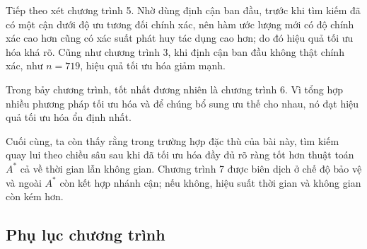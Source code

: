 \documentclass[11pt]{article}
\begin{document}
Tiếp theo xét chương trình 5. Nhờ dùng định cận ban đầu, trước khi tìm kiếm
đã có một cận dưới độ ưu tương đối chính xác, nên hàm ước lượng mới có độ
chính xác cao hơn cũng có xác suất phát huy tác dụng cao hơn; do đó hiệu quả
tối ưu hóa khá rõ. Cũng như chương trình 3, khi định cận ban đầu không thật
chính xác, như \(n=719\), hiệu quả tối ưu hóa giảm mạnh.

Trong bảy chương trình, tốt nhất đương nhiên là chương trình 6. Vì tổng hợp
nhiều phương pháp tối ưu hóa và để chúng bổ sung ưu thế cho nhau, nó đạt hiệu
quả tối ưu hóa ổn định nhất.

Cuối cùng, ta còn thấy rằng trong trường hợp đặc thù của bài này, tìm kiếm
quay lui theo chiều sâu sau khi đã tối ưu hóa đầy đủ rõ ràng tốt hơn thuật
toán \(A^\ast\) cả về thời gian lẫn không gian. Chương trình 7 được biên dịch
ở chế độ bảo vệ và ngoài \(A^\ast\) còn kết hợp nhánh cận; nếu không, hiệu
suất thời gian và không gian còn kém hơn.

\subsection{Phụ lục chương trình}
\end{document}
